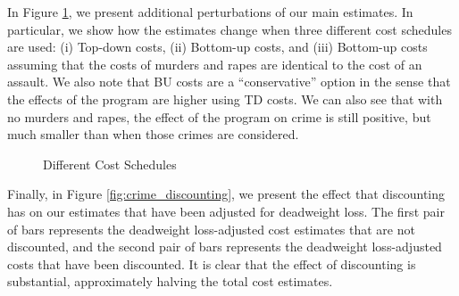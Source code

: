 \noindent In Figure \ref{fig:costs_schedules}, we present additional perturbations of our main estimates. In particular, we show how the estimates change when three different cost schedules are used: (i) Top-down costs, (ii) Bottom-up costs, and (iii) Bottom-up costs assuming that the costs of murders and rapes are identical to the cost of an assault. We also note that BU costs are a ``conservative'' option in the sense that the effects of the program are higher using TD costs. We can also see that with no murders and rapes, the effect of the program on crime is still positive, but much smaller than when those crimes are considered. \\

\begin{figure} [H]
\caption{Different Cost Schedules}
\centering  \label{fig:costs_schedules}
{}
\end{figure}

\noindent Finally, in Figure \ref{fig:crime_discounting}, we present the effect that discounting has on our estimates that have been adjusted for deadweight loss. The first pair of bars represents the deadweight loss-adjusted cost estimates that are not discounted, and the second pair of bars represents the deadweight loss-adjusted costs that have been discounted. It is clear that the effect of discounting is substantial, approximately halving the total cost estimates.

